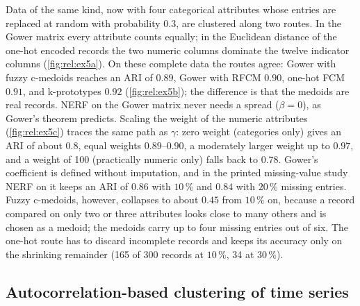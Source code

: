 Data of the same kind, now with four categorical attributes whose entries are replaced at random with probability $0.3$, are clustered along two routes. In the Gower matrix every attribute counts equally; in the Euclidean distance of the one-hot encoded records the two numeric columns dominate the twelve indicator columns (\cref{fig:rel:ex5a}). On these complete data the routes agree: Gower with fuzzy c-medoids reaches an ARI of $0.89$, Gower with RFCM $0.90$, one-hot FCM $0.91$, and k-prototypes $0.92$ (\cref{fig:rel:ex5b}); the difference is that the medoids are real records. NERF on the Gower matrix never needs a spread ($\beta=0$), as Gower's theorem predicts. Scaling the weight of the numeric attributes (\cref{fig:rel:ex5c}) traces the same path as $\gamma$: zero weight (categories only) gives an ARI of about $0.8$, equal weights $0.89$--$0.90$, a moderately larger weight up to $0.97$, and a weight of 100 (practically numeric only) falls back to $0.78$. Gower's coefficient is defined without imputation, and in the printed missing-value study NERF on it keeps an ARI of $0.86$ with $10$\,\% and $0.84$ with $20$\,\% missing entries. Fuzzy c-medoids, however, collapses to about $0.45$ from $10$\,\% on, because a record compared on only two or three attributes looks close to many others and is chosen as a medoid; the medoids carry up to four missing entries out of six. The one-hot route has to discard incomplete records and keeps its accuracy only on the shrinking remainder (165 of 300 records at $10$\,\%, 34 at $30$\,\%).


\subsection{Autocorrelation-based clustering of time series}

